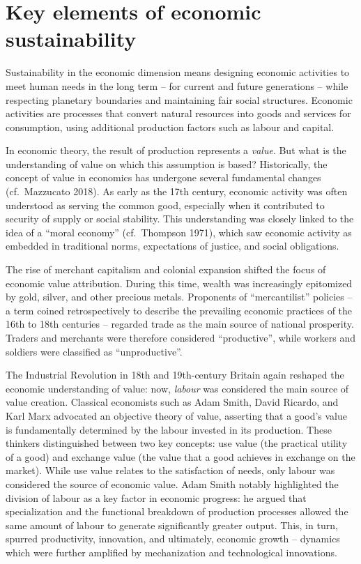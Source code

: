 \documentclass[
  a4paper,
  openany]{book}
\begin{document}
\section{Key elements of economic
sustainability}\label{key-elements-of-economic-sustainability}

Sustainability in the economic dimension means designing economic
activities to meet human needs in the long term -- for current and
future generations -- while respecting planetary boundaries and
maintaining fair social structures. Economic activities are processes
that convert natural resources into goods and services for consumption,
using additional production factors such as labour and capital.

In economic theory, the result of production represents a \emph{value}.
But what is the understanding of value on which this assumption is
based? Historically, the concept of value in economics has undergone
several fundamental changes (cf.~Mazzucato 2018). As early as the 17th
century, economic activity was often understood as serving the common
good, especially when it contributed to security of supply or social
stability. This understanding was closely linked to the idea of a
``moral economy'' (cf.~Thompson 1971), which saw economic activity as
embedded in traditional norms, expectations of justice, and social
obligations.

The rise of merchant capitalism and colonial expansion shifted the focus
of economic value attribution. During this time, wealth was increasingly
epitomized by gold, silver, and other precious metals. Proponents of
``mercantilist'' policies -- a term coined retrospectively to describe
the prevailing economic practices of the 16th to 18th centuries --
regarded trade as the main source of national prosperity. Traders and
merchants were therefore considered ``productive'', while workers and
soldiers were classified as ``unproductive''.

The Industrial Revolution in 18th and 19th-century Britain again
reshaped the economic understanding of value: now, \emph{labour} was
considered the main source of value creation. Classical economists such
as Adam Smith, David Ricardo, and Karl Marx advocated an objective
theory of value, asserting that a good's value is fundamentally
determined by the labour invested in its production. These thinkers
distinguished between two key concepts: use value (the practical utility
of a good) and exchange value (the value that a good achieves in
exchange on the market). While use value relates to the satisfaction of
needs, only labour was considered the source of economic value. Adam
Smith notably highlighted the division of labour as a key factor in
economic progress: he argued that specialization and the functional
breakdown of production processes allowed the same amount of labour to
generate significantly greater output. This, in turn, spurred
productivity, innovation, and ultimately, economic growth -- dynamics
which were further amplified by mechanization and technological
innovations.
\end{document}
